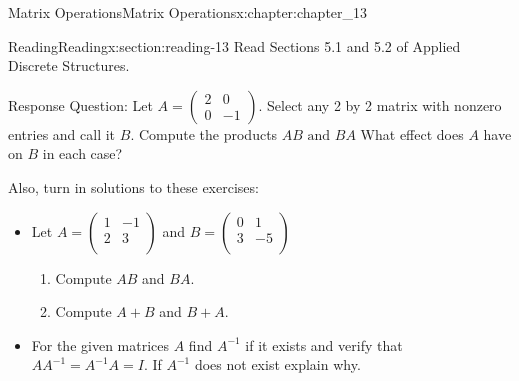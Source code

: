 \documentclass[oneside,10pt,]{book}
\numberwithin{equation}{section}
\begin{document}
%
%
\typeout{************************************************}
\typeout{************************************************}
%
\begin{chapterptx}{Matrix Operations}{}{Matrix Operations}{}{}{x:chapter:chapter_13}
\index{}%
%
%
\typeout{************************************************}
\typeout{************************************************}
%
\begin{sectionptx}{Reading}{}{Reading}{}{}{x:section:reading-13}
Read Sections 5.1 and 5.2 of Applied Discrete Structures.%
\par
Response Question:  Let \(A=\left(\begin{array}{cc} 2 & 0\\ 0 & -1 \end{array}\right)\). Select any 2 by 2 matrix with nonzero entries and call it \(B\). Compute the products \(AB \textrm{ and }BA\)  What effect does \(A\) have on \(B\) in each case?%
\par
Also, turn in solutions to these exercises:%
\begin{itemize}[label=\textbullet]
\item{}Let \(A=\left(
\begin{array}{cc}
1 & -1 \\
2 & 3 \\
\end{array}
\right)\) and  \(B =\left(
\begin{array}{cc}
0 & 1 \\
3 & -5 \\
\end{array}
\right)\)%
\par
%
\begin{enumerate}[label=(\alph*)]
\item{}Compute \(A B\) and \(B A\).%
\item{}Compute \(A + B\) and \(B + A\).%
\end{enumerate}
%
\item{}For the given matrices \(A\) find \(A^{-1}\) if it exists and verify that \(A A^{-1}=A^{-1}A = I\). If \(A^{-1}\) does not exist explain why.%
\par
%
\end{itemize}
\end{sectionptx}
\end{chapterptx}
\end{document}
